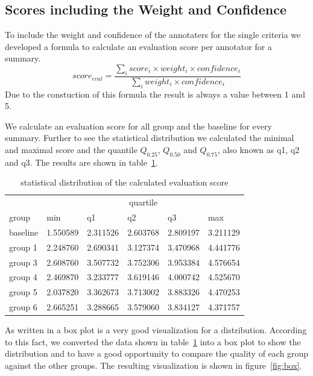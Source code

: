 \subsection{Scores including the Weight and Confidence}
\label{eva:box}
To include the weight and confidence of the annotaters for the single criteria we developed a formula to calculate an evaluation score per annotator for a summary.
$$score_{eval} = \frac{\sum_i score_i \times weight_i \times confidence_i}{\sum_i weight_i \times confidence_i}$$
Due to the constuction of this formula the result is always a value between 1 and 5.

We calculate an evaluation score for all group and the baseline for every summary.
Further to see the statistical distribution we calculated the minimal and maximal score and the quantile $Q_{0.25}$, $Q_{0.50}$ and $Q_{0.75}$, also known as q1, q2 and q3.
The results are shown in table~\ref{tab:evascore}.
\begin{table}[H]
	\begin{tabularx}{\textwidth}{X|XXXXX} \toprule
		         & \multicolumn{5}{c}{quartile}                         \\
		group    & min      & q1       & q2       & q3       & max      \\ \midrule
		baseline & 1.550589 & 2.311526 & 2.603768 & 2.809197 & 3.211129 \\
		group 1  & 2.248760 & 2.690341 & 3.127374 & 3.470968 & 4.441776 \\
		group 3  & 2.608760 & 3.507732 & 3.752306 & 3.953384 & 4.576654 \\
		group 4  & 2.469870 & 3.233777 & 3.619146 & 4.000742 & 4.525670 \\
		group 5  & 2.037820 & 3.362673 & 3.713002 & 3.883326 & 4.470253 \\
		group 6  & 2.665251 & 3.288665 & 3.579060 & 3.834127 & 4.371757 \\ \bottomrule
	\end{tabularx}
	\caption{statistical distribution of the calculated evaluation score}
	\label{tab:evascore}
\end{table}

As written in \citet{vis_mem} a box plot is a very good visualization for a distribution.
According to this fact, we converted the data shown in table~\ref{tab:evascore} into a box plot to show the distribution and to have a good opportunity to compare the quality of each group against the other groups. The resulting visualization is shown in figure~\ref{fig:box}.

